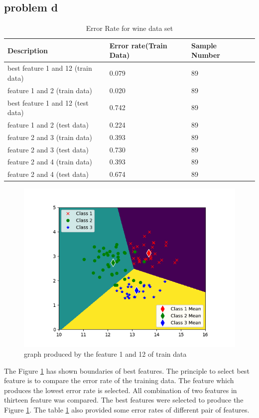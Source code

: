 \documentclass{article}
\begin{document}
	\subsection{problem d}
		\begin{table}[hbt!]
		\begin{center}
			\begin{tabular}{| l | l | l  | p{5cm} |}
				\hline
				Description     & Error rate(Train Data) & Sample Number    \\ \hline
best feature 1 and 12 (train data)     &0.079    &    89    \\      \hline
feature 1 and 2 (train data)  & 0.020	  &	   89     \\      \hline
best feature 1 and 12 (test data)	   & 0.742     &    89       \\      \hline
feature 1 and 2 (test data)      & 0.224	  &	   89      \\      \hline
feature 2 and 3 (train data)	   & 0.393    &    89       \\      \hline
feature 2 and 3 (test data)      & 0.730	  &	   89      \\      \hline
feature 2 and 4 (train data)	   & 0.393    &    89       \\      \hline
feature 2 and 4 (test data)      & 0.674	  &	   89      \\      \hline
			\end{tabular}
		\end{center}
		\caption{Error Rate for wine data set}
		\label{table: wineerrorrate}
	\end{table}
	\begin{figure}[hbt!]
		\includegraphics[width=\linewidth]{images/best_features_wine.png}	
		\caption{graph produced by the feature 1 and 12 of train data}
		\label{fig: bestFeature}
	\end{figure} 
	The Figure \ref{fig: bestFeature} has shown boundaries of best features. The principle to select best feature is to compare the error rate of the training data. The feature which produces the lowest error rate is selected. All combination of two features in thirteen feature was compared. The best features were selected to produce the Figure \ref{fig: bestFeature}. The table \ref{table: wineerrorrate} also provided some error rates of different pair of features.  
\end{document}
